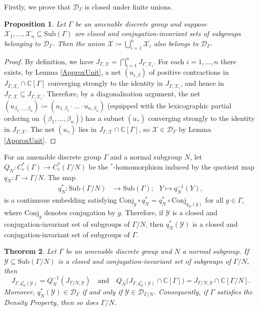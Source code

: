 \documentclass[11pt, oneside, reqno]{amsart}
\newtheorem{thm}{Theorem}[section]
\newtheorem{prp}[thm]{Proposition}
\theoremstyle{definition}
\theoremstyle{remark}
\numberwithin{equation}{section}
\begin{document}
Firstly, we prove that $\mathcal{D}_{\Gamma}$ is closed under finite unions.
\begin{prp}
\label{prp:finiteunion}
    Let $\Gamma$ be an amenable discrete group and suppose $\mathcal{X}_{1}, \dots, \mathcal{X}_n \subseteq \mathrm{Sub}(\Gamma)$ are closed and conjugation-invariant sets of subgroups belonging to $\mathcal{D}_{\Gamma}$. Then the union $\mathcal{X} \coloneq \bigcup_{i =1}^ n \mathcal{X}_{i}$ also belongs to $\mathcal{D}_{\Gamma}$.
\end{prp}

\begin{proof}
    By definition, we have $J_{\Gamma,\mathcal{X}} = \bigcap^{n}_{i=1}J_{\Gamma, \mathcal{X}_{i}}$. For each $i = 1, \dots, n$ there exists, by Lemma \ref{ApproxUnit}, a net $(u_{i,\beta})$ of positive contractions in $J_{\Gamma,\mathcal{X}_{i}}\cap\mathbb{C}[\Gamma]$ converging strongly to the identity in $J_{\Gamma, \mathcal{X}_{i}}$, and hence in $J_{\Gamma,\mathcal{X}} \subseteq J_{\Gamma, \mathcal{X}_{i}}$. Therefore, by a diagonalisation argument, the net $(u_{\beta_{1},...,\beta_{n}}) \coloneq (u_{1,\beta_{1}}\cdot ...\cdot u_{n,\beta_{n}})$ (equipped with the lexicographic partial ordering on $(\beta_{1},...,\beta_{n})$) has a subnet $(u_{\gamma})$ converging strongly to the identity in $J_{\Gamma,\mathcal{X}}$. The net $(u_\gamma)$ lies in $J_{\Gamma,\mathcal{X}} \cap \mathbb{C}[\Gamma]$, so $\mathcal{X}\in\mathcal{D}_{\Gamma}$ by Lemma \ref{ApproxUnit}.
\end{proof}

For an amenable discrete group $\Gamma$ and a normal subgroup $N$, let $Q_{N}:C^{*}_{r}(\Gamma)\to C^{*}_{r}(\Gamma/N)$ be the $^*$-homomorphism induced by the quotient map $q_{N}:\Gamma\to \Gamma/N$. The map 
\begin{align*}
    q^{*}_{N} \colon \text{Sub}(\Gamma/N) &\rightarrow \text{Sub}(\Gamma);
    \text{    } Y \mapsto q_{N}^{-1}(Y),
\end{align*}
is a continuous embedding satisfying $\text{Conj}_{g}\circ q^{*}_{N} = q^{*}_{N}\circ\text{Conj}_{q_{N}(g)}$ for all $g\in\Gamma$, where $\text{Conj}_{g}$ denotes conjugation by $g$. Therefore, if $\mathcal{Y}$ is a closed and conjugation-invariant set of subgroups of $\Gamma/N$, then $q^{*}_{N}(\mathcal{Y})$ is a closed and conjugation-invariant set of subgroups of $\Gamma$.

\begin{thm}
\label{thm:quotients}
    Let $\Gamma$ be an amenable discrete group and $N$ a normal subgroup. If $\mathcal{Y}\subseteq \mathrm{Sub}(\Gamma/N)$ is a closed and conjugation-invariant set of subgroups of $\Gamma/N$, then 
    \begin{equation}
    \label{LiftIdeal}
         J_{\Gamma, q_{N}^{*}(\mathcal{Y})} = Q_{N}^{-1}(J_{\Gamma/N,\mathcal{Y}}) \quad \text{and} \quad Q_{N}\big(J_{\Gamma, q_{N}^{*}(\mathcal{Y})} \cap \mathbb{C}[\Gamma] \big) = J_{\Gamma/N,\mathcal{Y}} \cap \mathbb{C}[\Gamma/N].
    \end{equation}
Moreover, $q^{*}_{N}(\mathcal{Y})\in\mathcal{D}_{\Gamma}$ if and only if $\mathcal{Y}\in\mathcal{D}_{\Gamma/N}$. Consequently, if $\Gamma$ satisfies the Density Property, then so does $\Gamma/N$.
\end{thm}
\end{document}
